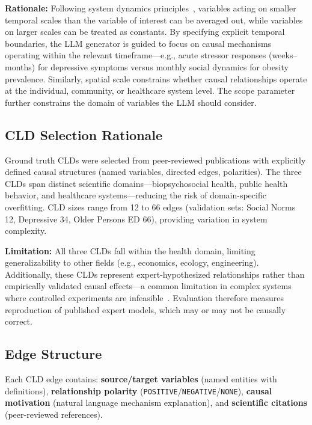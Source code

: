 \textbf{Rationale:} Following system dynamics principles~\cite{sterman2002system}, variables acting on smaller temporal scales than the variable of interest can be averaged out, while variables on larger scales can be treated as constants. By specifying explicit temporal boundaries, the LLM generator is guided to focus on causal mechanisms operating within the relevant timeframe---e.g., acute stressor responses (weeks--months) for depressive symptoms versus monthly social dynamics for obesity prevalence. Similarly, spatial scale constrains whether causal relationships operate at the individual, community, or healthcare system level. The scope parameter further constrains the domain of variables the LLM should consider.

\subsection{CLD Selection Rationale}
Ground truth CLDs were selected from peer-reviewed publications with explicitly defined causal structures (named variables, directed edges, polarities). The three CLDs span distinct scientific domains---biopsychosocial health, public health behavior, and healthcare systems---reducing the risk of domain-specific overfitting. CLD sizes range from 12 to 66 edges (validation sets: Social Norms 12, Depressive 34, Older Persons ED 66), providing variation in system complexity.

\textbf{Limitation:} All three CLDs fall within the health domain, limiting generalizability to other fields (e.g., economics, ecology, engineering). Additionally, these CLDs represent expert-hypothesized relationships rather than empirically validated causal effects---a common limitation in complex systems where controlled experiments are infeasible~\cite{uleman2024triangulation,crielaard2020socialnorms,smeekes2023emergency}. Evaluation therefore measures reproduction of published expert models, which may or may not be causally correct.

\subsection{Edge Structure}
Each CLD edge contains: \textbf{source/target variables} (named entities with definitions), \textbf{relationship polarity} (\texttt{POSITIVE}/\texttt{NEGATIVE}/\texttt{NONE}), \textbf{causal motivation} (natural language mechanism explanation), and \textbf{scientific citations} (peer-reviewed references).

